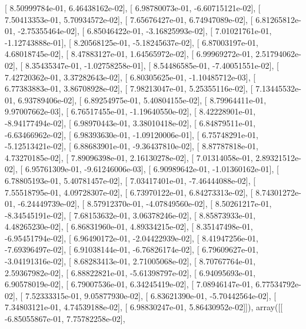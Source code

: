 \documentclass{article}
\begin{document}
       [  8.50999784e-01,   6.46438162e-02],
       [  6.98780073e-01,  -6.60715121e-02],
       [  7.50413353e-01,   5.70934572e-02],
       [  7.65676427e-01,   6.74947089e-02],
       [  6.81265812e-01,  -2.75355464e-02],
       [  6.85046422e-01,  -3.16825993e-02],
       [  7.01021761e-01,  -1.12743888e-01],
       [  8.20568125e-01,  -5.18245637e-02],
       [  6.87003197e-01,   4.68018745e-02],
       [  8.47883127e-01,   1.64565972e-02],
       [  6.99969272e-01,   2.51794062e-02],
       [  8.35435347e-01,  -1.02758258e-01],
       [  8.54486585e-01,  -7.40051551e-02],
       [  7.42720362e-01,   3.37282643e-02],
       [  6.80305625e-01,  -1.10485712e-03],
       [  6.77383883e-01,   3.86708928e-02],
       [  7.98213047e-01,   5.25355116e-02],
       [  7.13445532e-01,   6.93789406e-02],
       [  6.89254975e-01,   5.40804155e-02],
       [  8.79964411e-01,   9.97007662e-03],
       [  6.76517455e-01,  -1.19640550e-02],
       [  8.42228901e-01,  -8.94177494e-02],
       [  6.98970443e-01,   3.38010418e-02],
       [  6.84879511e-01,  -6.63466962e-02],
       [  6.98393630e-01,  -1.09120006e-01],
       [  6.75748291e-01,  -5.12513421e-02],
       [  6.88683901e-01,  -9.36437810e-02],
       [  8.87787818e-01,   4.73270185e-02],
       [  7.89096398e-01,   2.16130278e-02],
       [  7.01314058e-01,   2.89321512e-02],
       [  6.95761309e-01,  -9.61246006e-03],
       [  6.90989642e-01,  -1.01360162e-01],
       [  6.78805193e-01,   5.40781457e-02],
       [  7.03417401e-01,  -7.46444088e-02],
       [  7.55518795e-01,   4.09728307e-02],
       [  6.73970122e-01,   6.84273313e-02],
       [  8.74301272e-01,  -6.24449739e-02],
       [  8.57912370e-01,  -4.07849560e-02],
       [  8.50261217e-01,  -8.34545191e-02],
       [  7.68153632e-01,   3.06378246e-02],
       [  8.85873933e-01,   4.48265230e-02],
       [  6.86831960e-01,   4.89334215e-02],
       [  8.35147498e-01,  -6.95451794e-02],
       [  6.96490172e-01,  -2.04422939e-02],
       [  8.41947256e-01,  -7.69396497e-02],
       [  6.91038144e-01,  -6.76826174e-02],
       [  6.79609627e-01,  -3.04191316e-02],
       [  8.68283413e-01,   2.71005068e-02],
       [  8.70767764e-01,   2.59367982e-02],
       [  6.88822821e-01,  -5.61398797e-02],
       [  6.94095693e-01,   6.90578019e-02],
       [  6.79007536e-01,   6.34245419e-02],
       [  7.08946147e-01,   6.77534792e-02],
       [  7.52333315e-01,   9.05877930e-02],
       [  6.83621390e-01,  -5.70442564e-02],
       [  7.34803121e-01,   4.74539188e-02],
       [  6.98830247e-01,   5.86430952e-02]]), array([[ -6.85055867e-01,   7.75782258e-02],
\end{document}
